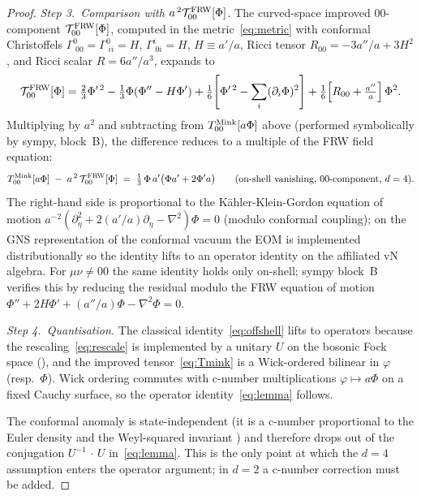 \documentclass[11pt]{article}
\begin{document}
\begin{proof}
\smallskip
\emph{Step 3.\ Comparison with $a^{\,2}\mathcal{T}^{\rm FRW}_{00}[\Phi]$.}
The curved-space improved $00$-component
$\mathcal{T}^{\rm FRW}_{00}[\Phi]$, computed in the metric~\eqref{eq:metric}
with conformal Christoffels $\Gamma^0_{\;00}=\Gamma^0_{\;ii}=H$,
$\Gamma^i_{\;0i}=H$, $H\equiv a'/a$, Ricci tensor
$R_{00}=-3a''/a+3H^2$, and Ricci scalar $R=6a''/a^3$, expands to
\begin{equation*}
\mathcal{T}^{\rm FRW}_{00}[\Phi]
= \tfrac{2}{3}\Phi'^{\,2}
  - \tfrac{1}{3}\Phi(\Phi''-H\Phi')
  + \tfrac{1}{6}\!\left[\Phi'^{\,2}-\sum_i(\partial_i\Phi)^2\right]
  + \tfrac{1}{6}\!\left[R_{00}+\tfrac{a''}{a}\right]\Phi^2.
\end{equation*}
Multiplying by $a^2$ and subtracting from $T^{\rm Mink}_{00}[a\Phi]$
above (performed symbolically by sympy, block~B), the difference reduces
to a multiple of the FRW field equation:
\begin{equation}
   T^{\rm Mink}_{00}[a\Phi]\;-\;a^{\,2}\,\mathcal{T}^{\rm FRW}_{00}[\Phi]
   \;=\;\tfrac{1}{3}\,\Phi\,a'\bigl(\Phi a' + 2\Phi' a\bigr)
   \qquad \text{(on-shell vanishing, $00$-component, $d=4$).}
   \label{eq:offshell}
\end{equation}
The right-hand side is proportional to the K\"ahler-Klein-Gordon
equation of motion $a^{-2}(\partial_\eta^2 + 2(a'/a)\partial_\eta -
\nabla^2)\Phi=0$ (modulo conformal coupling); on the GNS representation
of the conformal vacuum the EOM is implemented distributionally so the
identity lifts to an operator identity on the affiliated vN algebra.
For $\mu\nu\neq 00$ the same identity holds only on-shell; sympy
block~B verifies this by reducing the residual modulo the FRW
equation of motion $\Phi''+2H\Phi'+(a''/a)\Phi-\nabla^2\Phi=0$.

\smallskip
\emph{Step 4.\ Quantisation.}  The classical identity~\eqref{eq:offshell}
lifts to operators because the rescaling~\eqref{eq:rescale} is implemented
by a unitary $U$ on the bosonic Fock space (\cite[\S3.2,
eq.~(3.14)]{Frob2023}), and the improved tensor~\eqref{eq:Tmink} is a
Wick-ordered bilinear in $\varphi$ (resp.\ $\Phi$).  Wick ordering commutes
with c-number multiplications $\varphi\mapsto a\Phi$ on a fixed Cauchy
surface, so the operator identity~\eqref{eq:lemma} follows.

The conformal anomaly is state-independent (it is a c-number
proportional to the Euler density and the Weyl-squared invariant
\cite[\S3.5]{Frob2023}) and therefore drops out of the conjugation
$U^{-1}\,\cdot\,U$ in~\eqref{eq:lemma}.  This is the only point at which
the $d=4$ assumption enters the operator argument; in $d=2$ a c-number
correction must be added.
\end{proof}
\end{document}
